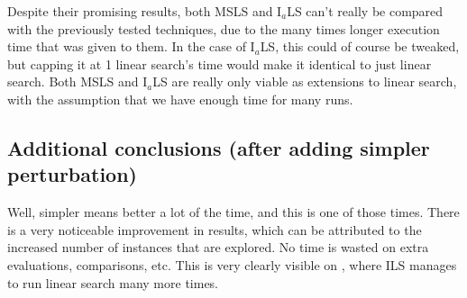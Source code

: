 \documentclass[14pt]{article}
\begin{document}
Despite their promising results, both MSLS and I$_a$LS can't really be compared
with the previously tested techniques, due to the many times longer execution
time that was given to them. In the case of I$_a$LS, this could of course be
tweaked, but capping it at 1 linear search's time would make it identical to
just linear search. Both MSLS and I$_a$LS are really only viable as extensions to
linear search, with the assumption that we have enough time for many runs.

\subsection{Additional conclusions (after adding simpler perturbation)}
Well, simpler means better a lot of the time, and this is one of those times.
There is a very noticeable improvement in results, which can be attributed to
the increased number of instances that are explored. No time is wasted on extra
evaluations, comparisons, etc. This is very clearly visible on
, where ILS manages to run linear search many more
times.
\end{document}
